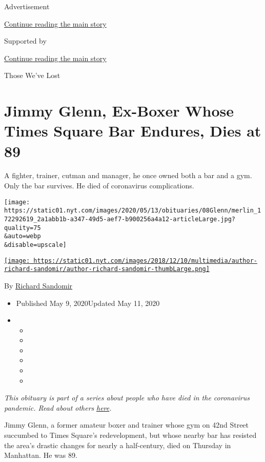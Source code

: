 Advertisement

\protect\hyperlink{after-top}{Continue reading the main story}

Supported by

\protect\hyperlink{after-sponsor}{Continue reading the main story}

Those We've Lost

\hypertarget{jimmy-glenn-ex-boxer-whose-times-square-bar-endures-dies-at-89}{%
\section{Jimmy Glenn, Ex-Boxer Whose Times Square Bar Endures, Dies at
89}\label{jimmy-glenn-ex-boxer-whose-times-square-bar-endures-dies-at-89}}

A fighter, trainer, cutman and manager, he once owned both a bar and a
gym. Only the bar survives. He died of coronavirus complications.

\texttt{[image: https://static01.nyt.com/images/2020/05/13/obituaries/08Glenn/merlin\_172292619\_2a1abb1b-a347-49d5-aef7-b900256a4a12-articleLarge.jpg?quality=75\\\&auto=webp\\\&disable=upscale]}

\href{https://www.nytimes.com/by/richard-sandomir}{\texttt{[image: https://static01.nyt.com/images/2018/12/10/multimedia/author-richard-sandomir/author-richard-sandomir-thumbLarge.png]}}

By \href{https://www.nytimes.com/by/richard-sandomir}{Richard Sandomir}

\begin{itemize}
\item
  Published May 9, 2020Updated May 11, 2020
\item
  \begin{itemize}
  \item
  \item
  \item
  \item
  \item
  \item
  \end{itemize}
\end{itemize}

\emph{This obituary is part of a series about people who have died in
the coronavirus pandemic. Read about others}
\href{https://www.nytimes.com/series/people-who-have-died-of-the-coronavirus}{\emph{here}}\emph{.}

Jimmy Glenn, a former amateur boxer and trainer whose gym on 42nd Street
succumbed to Times Square's redevelopment, but whose nearby bar has
resisted the area's drastic changes for nearly a half-century, died on
Thursday in Manhattan. He was 89.

